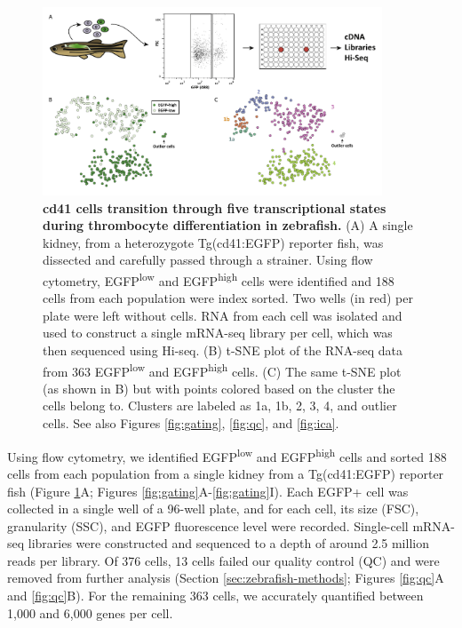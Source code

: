 \begin{figure}
    \centering
    \includegraphics[width=0.9\textwidth]{"Figure1"}
    \caption[cd41 cells transition through five transcriptional states during thrombocyte differentiation in zebrafish]{\textbf{cd41 cells transition through five transcriptional states during thrombocyte differentiation in zebrafish.} (A) A single kidney, from a heterozygote Tg(cd41:EGFP) reporter fish, was dissected and carefully passed through a strainer. Using flow cytometry, EGFP\textsuperscript{low} and EGFP\textsuperscript{high} cells were identified and 188 cells from each population were index sorted. Two wells (in red) per plate were left without cells. RNA from each cell was isolated and used to construct a single mRNA-seq library per cell, which was then sequenced using Hi-seq. (B)	t-SNE plot of the RNA-seq data from 363 EGFP\textsuperscript{low} and EGFP\textsuperscript{high} cells. (C)	The same t-SNE plot (as shown in B) but with points colored based on the cluster the cells belong to. Clusters are labeled as 1a, 1b, 2, 3, 4, and outlier cells. See also Figures \ref{fig:gating}, \ref{fig:qc}, and \ref{fig:ica}.}
    \label{fig:sorting}
\end{figure}

\begin{sloppypar}
Using flow cytometry, we identified EGFP\textsuperscript{low} and EGFP\textsuperscript{high} cells and sorted 188 cells from each population from a single kidney from a Tg(cd41:EGFP) reporter fish (Figure \ref{fig:sorting}A; Figures \ref{fig:gating}A-\ref{fig:gating}I). Each EGFP+ cell was collected in a single well of a 96-well plate, and for each cell, its size (FSC), granularity (SSC), and EGFP fluorescence level were recorded. Single-cell mRNA-seq libraries were constructed and sequenced to a depth of around 2.5 million reads per library. Of 376 cells, 13 cells failed our quality control (QC) and were removed from further analysis (Section \ref{sec:zebrafish-methods}; Figures \ref{fig:qc}A and \ref{fig:qc}B). For the remaining 363 cells, we accurately quantified between 1,000 and 6,000 genes per cell.
\end{sloppypar}

